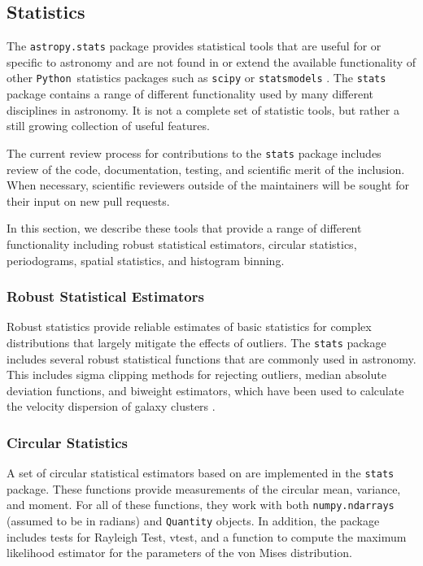 \documentclass[modern]{aastex61}
\newcommand{\package}[1]{\texttt{#1}\xspace}
\newcommand{\python}{\package{Python}}
\begin{document}
\subsection{Statistics}

The \package{astropy.stats} package provides statistical tools that
are useful for or specific to astronomy and are not found in or extend
the available functionality of other \python\ statistics packages such
as \package{scipy} \citep{scipy} or \package{statsmodels}
\citep{seabold2010statsmodels}.  The \package{stats} package contains
a range of different functionality used by many different disciplines
in astronomy.  It is not a complete set of statistic tools, but rather
a still growing collection of useful features.

The current review process for contributions to the \package{stats} package includes review of the code, documentation, testing, and scientific merit of the inclusion.  When necessary, scientific reviewers outside of the maintainers will be sought for their input on new pull requests.

In this section, we describe these tools that provide a range of different functionality including robust statistical estimators, circular statistics, periodograms, spatial statistics, and histogram binning.



\subsubsection{Robust Statistical Estimators}

Robust statistics provide reliable estimates of basic statistics for complex distributions that largely mitigate the effects of outliers. The \package{stats} package includes several robust statistical functions that are commonly used in astronomy. This includes sigma clipping methods for rejecting outliers, median absolute deviation functions, and biweight estimators, which have been used to calculate the velocity dispersion of galaxy clusters \citep{Beers1990}.

\subsubsection{Circular Statistics}

A set of circular statistical estimators based on \citet{JammalamadakaSengupta}
are implemented in the \package{stats} package.  These functions provide
measurements of the circular mean, variance, and moment.   For all of these
functions, they work with both \texttt{numpy.ndarrays} (assumed to be in
radians) and \texttt{Quantity} objects.  In addition, the package includes
tests for Rayleigh Test, vtest, and a function to compute the maximum likelihood estimator for the parameters of the von Mises
distribution.
\end{document}
